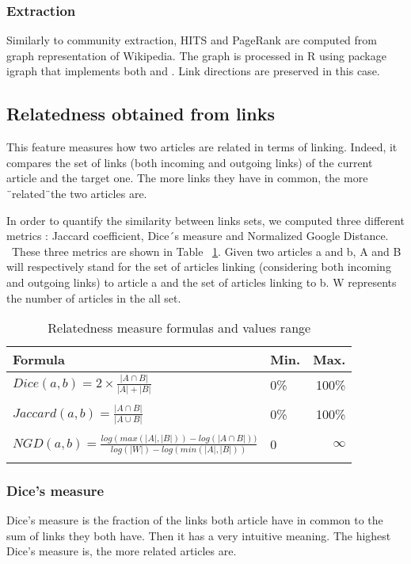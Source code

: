 \subsubsection{Extraction}
Similarly to community extraction, HITS and PageRank are computed from graph representation of Wikipedia. The graph is processed in R using package igraph that implements both \cite{pagerank} and \cite{hits}. Link directions are preserved in this case.

\subsection{Relatedness obtained from links}

This feature measures how two articles are related in terms of linking. Indeed, it compares the set of links (both incoming and outgoing links) of the current article and the target one. The more links they have in common, the more \"\ related\"\ the two articles are. \

In order to quantify the similarity between links sets, we computed three different metrics  : Jaccard coefficient, Dice\'\ s measure and Normalized Google Distance. \
These three metrics are shown in Table ~\ref{fig:formulas}. Given two articles a and b, A and B will respectively stand for the set of articles linking (considering both incoming and outgoing links) to article a and the set of articles linking to b. W represents the number of articles in the all set.

\begin{table}[H]
\caption{Relatedness measure formulas and values range}
\centering
\begin{tabular}{llr}
\toprule
\cmidrule(r){1-2}
Formula & Min. & Max.\\
\midrule
$Dice(a,b)=2\times\frac{|A \cap B|}{|A| + |B|}$ & 0\% & 100\% \\
 & & \\
$Jaccard(a,b)= \frac{|A\cap B|}{|A\cup B|}$ & 0\% & 100\% \\
 & & \\
$NGD(a,b)= \frac{log(max(|A|,|B|))-log(|A\cap B|))}{log(|W|)-log(min(|A|,|B|))}$ & 0 & $\infty $ \\
\bottomrule
\label{fig:formulas}
\end{tabular}
\end{table}

\subsubsection*{Dice's measure}
Dice's measure is the fraction of the links both article have in common to the sum of links they both have. Then it has a very intuitive meaning. The highest Dice's measure is, the more related articles are.\

